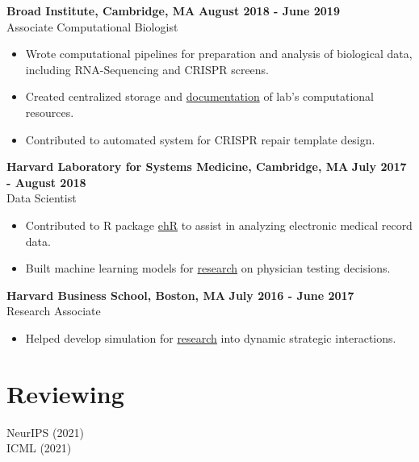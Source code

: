 \documentclass[margin,line]{res}
\begin{document}
\begin{resume}
\textbf{Broad Institute, Cambridge, MA} \hfill \textbf{August 2018 - June 2019} \\
Associate Computational Biologist \\
\begin{itemize}
    \item Wrote computational pipelines for preparation and analysis of biological data, including RNA-Sequencing and CRISPR screens.
    \item Created centralized storage and \href{https://xavier-lab.readthedocs.io/en/master/?}{documentation} of lab's computational resources.
    \item Contributed to automated system for CRISPR repair template design. 
\end{itemize}

\textbf{Harvard Laboratory for Systems Medicine, Cambridge, MA} \hfill \textbf{July 2017 - August 2018} \\
Data Scientist \\
\begin{itemize} 
    \item Contributed to R package \href{https://github.com/sysmedlab/ehR}{ehR} to assist in analyzing electronic medical record data.
    \item Built machine learning models for \href{https://eml.berkeley.edu/~webfac/auerbach/w26168.pdf}{research} on physician testing decisions.
\end{itemize}

\textbf{Harvard Business School, Boston, MA} \hfill \textbf{July 2016 - June 2017} \\
Research Associate \\ 
\begin{itemize}
    \item Helped develop simulation for \href{https://www.hbs.edu/faculty/Publication%20Files/17-095_9c642396-3599-4250-a7a6-c25eec842a56.pdf}{research}
    into dynamic strategic interactions. 
\end{itemize}

\section{\sc Reviewing}

NeurIPS (2021) \\
ICML (2021)

\end{resume}
\end{document}
